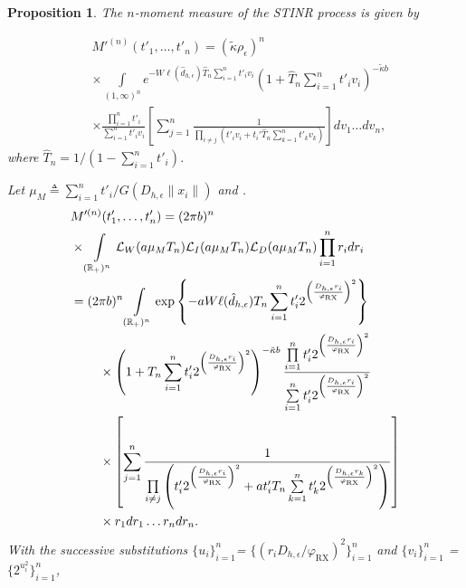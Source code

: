 \documentclass[lettersize,journal]{IEEEtran}
\newcommand{\R}{\mathbb{R}}
\newtheorem{prop}[theorem]{Proposition}
\begin{document}
\begin{prop}
  The $n$-moment measure of the STINR process is given by

    \begin{align}
      &M'^{(n)}(t'_1,\dots,t'_n) =\left(\tilde{\kappa} \rho_{\epsilon}\right)^n \nonumber\\
      &\times \int\limits_{(1,\infty)^n} e^{-W\ell(\hat{d}_{h,\epsilon})\hat{T}_n\sum\limits_{i=1}^nt'_iv_i} \left(1+\hat{T}_n\sum\limits_{i=1}^nt'_iv_i\right)^{-\tilde{\kappa}b} \nonumber\\
      &\times \frac{\prod\limits_{i=1}^nt'_i}{\sum\limits_{i=1}^nt'_iv_i}  \left[\sum\limits_{j=1}^n\frac{1}{\prod\limits_{i\neq j}\left(t'_i v_i+ t_i'\hat{T}_n\sum\limits_{k=1}^nt'_kv_k \right)} \right] dv_1 \dots dv_n,
    \end{align}
    where $\hat{T}_n= 1/(1-\sum_{i=1}^nt'_i)$.

      Let $\mu_M \triangleq \sum_{i=1}^nt'_i/G(D_{h,\epsilon}\|x_i\|)$ and . 
  \begin{align}
    &M'^{(n)}(t'_1,\dots,t'_n) =(2 \pi b)^n\nonumber\\
    & \times\int\limits_{(\R_+)^n} \mathcal{L}_W(a\mu_MT_n)\mathcal{L}_I(a\mu_MT_n)\mathcal{L}_D(a\mu_MT_n)\prod_{i=1}^nr_i dr_i\nonumber \\
    &=(2 \pi b)^n \int\limits_{(\R_+)^n} \exp\left\{-aW\ell(\hat{d}_{h,\epsilon})T_n\sum\limits_{i=1}^nt'_i2^{\left(\frac{D_{h,\epsilon}r_i}{\varphi_{\text{RX}}}\right)^2}\right\} \nonumber\\
    &\hspace{0.8cm}\times\left(1+T_n\sum\limits_{i=1}^nt'_i2^{\left(\frac{D_{h,\epsilon}r_i}{\varphi_{\text{RX}}}\right)^2}\right)^{- \tilde{\kappa}b} \frac{\prod\limits_{i=1}^nt'_i2^{\left(\frac{D_{h,\epsilon}r_i}{\varphi_{\text{RX}}}\right)^2}}{\sum\limits_{i=1}^nt'_i2^{\left(\frac{D_{h,\epsilon}r_i}{\varphi_{\text{RX}}}\right)^2}} \nonumber\\
    &\hspace{0.8cm}\times  \left[\sum\limits_{j=1}^n\frac{1}{\prod\limits_{i\neq j}\left(t'_i 2^{\left(\frac{D_{h,\epsilon}r_i}{\varphi_{\text{RX}}}\right)^2}+a t_i'T_n\sum\limits_{k=1}^nt'_k2^{\left(\frac{D_{h,\epsilon}r_k}{\varphi_{\text{RX}}}\right)^2} \right)} \right] \nonumber\\
    &\hspace{0.8cm}\times r_1 dr_1 \dots r_n dr_n.
  \end{align}
  With the successive substitutions $\{u_i\}_{i= 1}^n$= $\{  (r_i D_{h,\epsilon}/\varphi_{\text{RX}})^2\}_{i= 1}^n$ and $\{v_i\}_{i= 1}^n$ =$\{ 2^{u_i^2}\}_{i= 1}^n$,

\end{prop}
\end{document}
